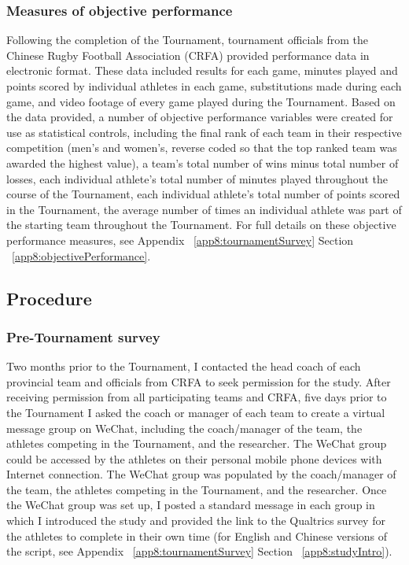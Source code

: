 \begin{CJK}{UTF8}{gbsn}
\subsubsection{\label{app8:objectivePerformance}Measures of objective performance}
Following the completion of the Tournament, tournament officials from the Chinese Rugby Football Association (CRFA) provided performance data in electronic format. These data included results for each game, minutes played and points scored by individual athletes in each game, substitutions made during each game, and video footage of every game played during the Tournament.  Based on the data provided, a number of objective performance variables were created for use as statistical controls, including the final rank of each team in their respective competition (men's and women's, reverse coded so that the top ranked team was awarded the highest value), a team's total number of wins minus total number of losses, each individual athlete's total number of minutes played throughout the course of the Tournament, each individual athlete's total number of points scored in the Tournament, the average number of times an individual athlete was part of the starting team throughout the Tournament. For full details on these objective performance measures, see Appendix ~\ref{app8:tournamentSurvey} Section ~\ref{app8:objectivePerformance}.











\subsection{Procedure}

\subsubsection{Pre-Tournament survey}
Two months prior to the Tournament, I contacted the head coach of each provincial team and officials from CRFA to seek permission for the study.  After receiving permission from all participating teams and CRFA, five days prior to the Tournament I asked the coach or manager of each team to create a virtual message group on WeChat, including the coach/manager of the team, the athletes competing in the Tournament, and the researcher.  The WeChat group could be accessed by the athletes on their personal mobile phone devices with Internet connection. The WeChat group was populated by the coach/manager of the team, the athletes competing in the Tournament, and the researcher. Once the WeChat group was set up, I posted a standard message in each group in which I introduced the study and provided the link to the Qualtrics survey for the athletes to complete in their own time (for English and Chinese versions of the script, see Appendix ~\ref{app8:tournamentSurvey} Section ~\ref{app8:studyIntro}).


\end{CJK}
